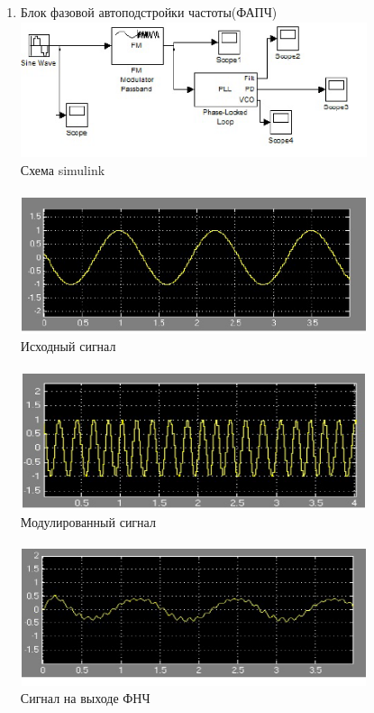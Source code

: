 \documentclass[10pt,a4paper]{article}
\begin{document}
\begin{enumerate}
\\
\item Блок фазовой автоподстройки частоты(ФАПЧ)
\\
\includegraphics[width=4in,height=40mm]{r89}
\\
Схема simulink
\\
\\
\includegraphics[width=4in,height=40mm]{r90}
\\
Исходный сигнал
\\
\\
\includegraphics[width=4in,height=40mm]{r91}
\\
Модулированный сигнал
\\
\\
\includegraphics[width=4in,height=40mm]{r92}
\\
Сигнал на выходе ФНЧ
\\
\\

\end{enumerate}
\end{document}
